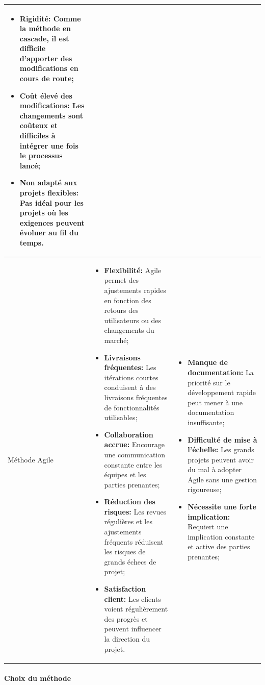 \documentclass[12pt]{report}
\begin{document}
\begin{longtable}{|p{3cm}|p{5.5cm}|p{5.5cm}|}
\begin{itemize}
							\item \textbf{Rigidité:} Comme la méthode en cascade, il est difficile d'apporter des modifications en cours de route;
							\item \textbf{Coût élevé des modifications:} Les changements sont coûteux et difficiles à intégrer une fois le processus lancé;
							\item \textbf{Non adapté aux projets flexibles:} Pas idéal pour les projets où les exigences peuvent évoluer au fil du temps.
						\end{itemize}\\
						\hline 
						Méthode Agile &
						\begin{itemize}
							\item \textbf{Flexibilité:} Agile permet des ajustements rapides en fonction des retours des utilisateurs ou des changements du marché;
							\item \textbf{Livraisons fréquentes:} Les itérations courtes conduisent à des livraisons fréquentes de fonctionnalités utilisables;
							\item \textbf{Collaboration accrue:} Encourage une communication constante entre les équipes et les parties prenantes;
							\item \textbf{Réduction des risques:} Les revues régulières et les ajustements fréquents réduisent les risques de grands échecs de projet;
							\item \textbf{Satisfaction client:} Les clients voient régulièrement des progrès et peuvent influencer la direction du projet.
						\end{itemize} &
						\begin{itemize}
							\item \textbf{Manque de documentation:} La priorité sur le développement rapide peut mener à une documentation insuffisante;
							\item \textbf{Difficulté de mise à l'échelle:} Les grands projets peuvent avoir du mal à adopter Agile sans une gestion rigoureuse;
							\item \textbf{Nécessite une forte implication:} Requiert une implication constante et active des parties prenantes;
						\end{itemize}\\
						\hline 
				    \end{longtable}

				\paragraph{Choix du méthode}	
\end{document}
